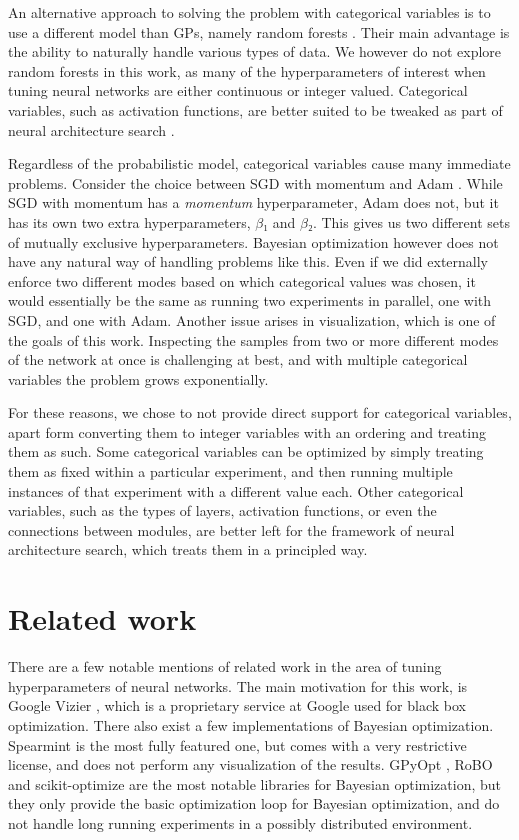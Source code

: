 An alternative approach to solving the problem with categorical variables is to
use a different model than GPs, namely random forests
\citep{nando-bayesian-out-of-the-loop}. Their main advantage is the ability to
naturally handle various types of data. We however do not explore random
forests in this work, as many of the hyperparameters of interest when tuning
neural networks are either continuous or integer valued. Categorical variables,
such as activation functions, are better suited to be tweaked as part of neural
architecture search \citep{nasnet}.

Regardless of the probabilistic model, categorical variables cause many
immediate problems.  Consider the choice between SGD with momentum
\citep{overview-of-sgd} and Adam \citep{kingma2014adam}.  While SGD with
momentum has a \emph{momentum} hyperparameter, Adam does not, but it has its
own two extra hyperparameters, $β₁$ and $β₂$. This gives us two different sets
of mutually exclusive hyperparameters. Bayesian optimization however does not
have any natural way of handling problems like this. Even if we did externally
enforce two different modes based on which categorical values was chosen, it
would essentially be the same as running two experiments in parallel, one with
SGD, and one with Adam. Another issue arises in visualization, which is one of
the goals of this work. Inspecting the samples from two or more different modes
of the network at once is challenging at best, and with multiple categorical
variables the problem grows exponentially.

For these reasons, we chose to not provide direct support for categorical
variables, apart form converting them to integer variables with an ordering and
treating them as such. Some categorical variables can be optimized by simply
treating them as fixed within a particular experiment, and then running
multiple instances of that experiment with a different value each. Other
categorical variables, such as the types of layers, activation functions, or
even the connections between modules, are better left for the framework of
neural architecture search, which treats them in a principled way.


\section{Related work}

There are a few notable mentions of related work in the area of tuning
hyperparameters of neural networks. The main motivation for this work, is
Google Vizier \citep{google-vizier}, which is a proprietary service at Google
used for black box optimization. There also exist a few implementations of
Bayesian optimization. Spearmint \citep{spearmint} is the most fully featured
one, but comes with a very restrictive license, and does not perform any
visualization of the results. GPyOpt \citep{gpyopt2016}, RoBO \citep{robo} and scikit-optimize
\citep{scikit-optimize} are the most notable libraries for Bayesian
optimization, but they only provide the basic optimization loop for Bayesian
optimization, and do not handle long running experiments in a possibly
distributed environment.

